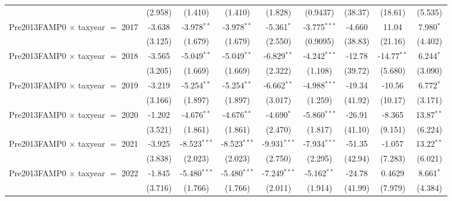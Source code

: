 \begin{tabular}{lcccccccc}
                                           & (2.958)       & (1.410)        & (1.410)        & (1.828)        & (0.9437)       & (38.37)       & (18.61)       & (5.535)\\   
   Pre2013FAMP0 $\times$ taxyear $=$ 2017  & -3.638        & -3.978$^{**}$  & -3.978$^{**}$  & -5.361$^{*}$   & -3.775$^{***}$ & -4.660        & 11.04         & 7.980$^{*}$\\   
                                           & (3.125)       & (1.679)        & (1.679)        & (2.550)        & (0.9095)       & (38.83)       & (21.16)       & (4.402)\\   
   Pre2013FAMP0 $\times$ taxyear $=$ 2018  & -3.565        & -5.049$^{**}$  & -5.049$^{**}$  & -6.829$^{**}$  & -4.242$^{***}$ & -12.78        & -14.77$^{**}$ & 6.244$^{*}$\\   
                                           & (3.205)       & (1.669)        & (1.669)        & (2.322)        & (1.108)        & (39.72)       & (5.680)       & (3.090)\\   
   Pre2013FAMP0 $\times$ taxyear $=$ 2019  & -3.219        & -5.254$^{**}$  & -5.254$^{**}$  & -6.662$^{**}$  & -4.988$^{***}$ & -19.34        & -10.56        & 6.772$^{*}$\\   
                                           & (3.166)       & (1.897)        & (1.897)        & (3.017)        & (1.259)        & (41.92)       & (10.17)       & (3.171)\\   
   Pre2013FAMP0 $\times$ taxyear $=$ 2020  & -1.202        & -4.676$^{**}$  & -4.676$^{**}$  & -4.690$^{*}$   & -5.860$^{***}$ & -26.91        & -8.365        & 13.87$^{**}$\\   
                                           & (3.521)       & (1.861)        & (1.861)        & (2.470)        & (1.817)        & (41.10)       & (9.151)       & (6.224)\\   
   Pre2013FAMP0 $\times$ taxyear $=$ 2021  & -3.925        & -8.523$^{***}$ & -8.523$^{***}$ & -9.931$^{***}$ & -7.934$^{***}$ & -51.35        & -1.057        & 13.22$^{**}$\\   
                                           & (3.838)       & (2.023)        & (2.023)        & (2.750)        & (2.295)        & (42.94)       & (7.283)       & (6.021)\\   
   Pre2013FAMP0 $\times$ taxyear $=$ 2022  & -1.845        & -5.480$^{***}$ & -5.480$^{***}$ & -7.249$^{***}$ & -5.162$^{**}$  & -24.78        & 0.4629        & 8.661$^{*}$\\   
                                           & (3.716)       & (1.766)        & (1.766)        & (2.011)        & (1.914)        & (41.99)       & (7.979)       & (4.384)\\   

\end{tabular}
